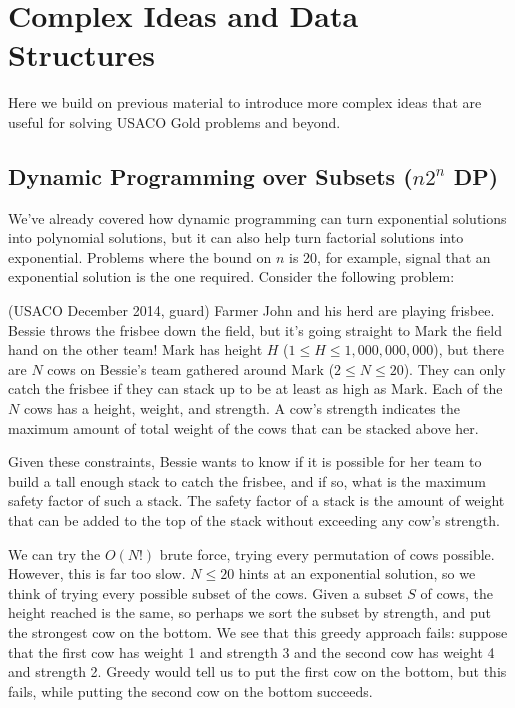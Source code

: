 \chapter{Complex Ideas and Data Structures}

Here we build on previous material to introduce more complex ideas that are useful for solving USACO Gold problems and beyond.

\section{Dynamic Programming over Subsets ($n2^n$ DP)}

We've already covered how dynamic programming can turn exponential solutions into polynomial solutions, but it can also help turn factorial solutions into exponential. Problems where the bound on $n$ is 20, for example, signal that an exponential solution is the one required. Consider the following problem:

(USACO December 2014, guard)
Farmer John and his herd are playing frisbee.  Bessie throws the
frisbee down the field, but it's going straight to Mark the field hand
on the other team!  Mark has height $H$ ($1 \le H \le 1,000,000,000$), but
there are $N$ cows on Bessie's team gathered around Mark ($2 \le N \le 20$).
They can only catch the frisbee if they can stack up to be at least as
high as Mark.  Each of the $N$ cows has a height, weight, and strength.
A cow's strength indicates the maximum amount of total weight of the
cows that can be stacked above her.  

Given these constraints, Bessie wants to know if it is possible for
her team to build a tall enough stack to catch the frisbee, and if so,
what is the maximum safety factor of such a stack.  The safety factor
of a stack is the amount of weight that can be added to the top of the
stack without exceeding any cow's strength.

We can try the $O(N!)$ brute force, trying every permutation of cows possible. However, this is far too slow. $N \le 20$ hints at an exponential solution, so we think of trying every possible subset of the cows. Given a subset $S$ of cows, the height reached is the same, so perhaps we sort the subset by strength, and put the strongest cow on the bottom. We see that this greedy approach fails: suppose that the first cow has weight 1 and strength 3 and the second cow has weight 4 and strength 2. Greedy would tell us to put the first cow on the bottom, but this fails, while putting the second cow on the bottom succeeds.

